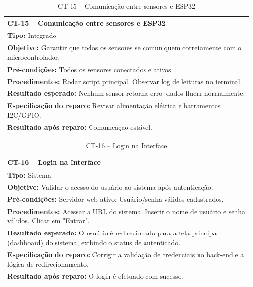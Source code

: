 
\begin{table}[H]
\centering
\begin{tabular}{|p{}|}
\hline
\textbf{CT-15 – Comunicação entre sensores e ESP32} \\ \hline
\textbf{Tipo:} Integrado \\ \hline
\textbf{Objetivo:} Garantir que todos os sensores se comuniquem corretamente com o microcontrolador. \\ \hline
\textbf{Pré-condições:} Todos os sensores conectados e ativos. \\ \hline
\textbf{Procedimentos:} Rodar script principal. Observar log de leituras no terminal. \\ \hline
\textbf{Resultado esperado:} Nenhum sensor retorna erro; dados fluem normalmente. \\ \hline
\textbf{Especificação do reparo:} Revisar alimentação elétrica e barramentos I2C/GPIO. \\ \hline
\textbf{Resultado após reparo:} Comunicação estável. \\ \hline
\end{tabular}
\caption{CT-15 – Comunicação entre sensores e ESP32}
\end{table}


\begin{table}[H]
\centering
\begin{tabular}{|p{}|}
\hline
\textbf{CT-16 – Login na Interface} \\ \hline
\textbf{Tipo:} Sistema \\ \hline
\textbf{Objetivo:} Validar o acesso do usuário ao sistema após autenticação. \\ \hline
\textbf{Pré-condições:} Servidor web ativo; Usuário/senha válidos cadastrados. \\ \hline
\textbf{Procedimentos:} Acessar a URL do sistema. Inserir o nome de usuário e senha válidos. Clicar em "Entrar". \\ \hline
\textbf{Resultado esperado:} O usuário é redirecionado para a tela principal (dashboard) do sistema, exibindo o status de autenticado. \\ \hline
\textbf{Especificação do reparo:} Corrigir a validação de credenciais no back-end e a lógica de redirecionamento. \\ \hline
\textbf{Resultado após reparo:} O login é efetuado com sucesso. \\ \hline
\end{tabular}
\caption{CT-16 – Login na Interface}
\end{table}

